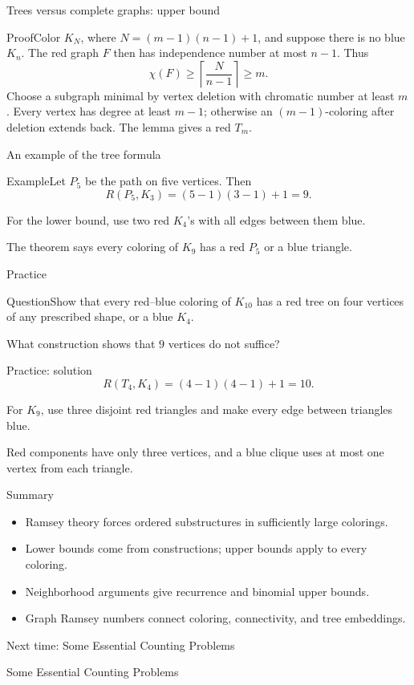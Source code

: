 \documentclass[aspectratio=169,11pt]{beamer}
\renewcommand{\Proof}[1]{\begin{block}{Proof}\normalsize #1\end{block}}
\newcommand{\Question}[1]{\begin{block}{Question}#1\end{block}}
\renewcommand{\Example}[1]{\begin{block}{Example}#1\end{block}}
\newcommand{\gap}{\par\medskip}
\begin{document}
\begin{frame}{Trees versus complete graphs: upper bound}
\large
\Proof{Color $K_N$, where $N=(m-1)(n-1)+1$, and suppose there is no blue $K_n$. The red graph $F$ then has independence number at most $n-1$. Thus
\[\chi(F)\geq\left\lceil\frac{N}{n-1}\right\rceil\geq m.\]
Choose a subgraph minimal by vertex deletion with chromatic number at least $m$. Every vertex has degree at least $m-1$; otherwise an $(m-1)$-coloring after deletion extends back. The lemma gives a red $T_m$.}
\end{frame}
\begin{frame}{An example of the tree formula}
\large
\Example{Let $P_5$ be the path on five vertices. Then
\[R(P_5,K_3)=(5-1)(3-1)+1=9.\]}
\gap For the lower bound, use two red $K_4$'s with all edges between them blue.
\gap The theorem says every coloring of $K_9$ has a red $P_5$ or a blue triangle.
\end{frame}
\begin{frame}{Practice}
\large
\Question{Show that every red--blue coloring of $K_{10}$ has a red tree on four vertices of any prescribed shape, or a blue $K_4$.}
\gap What construction shows that $9$ vertices do not suffice?
\end{frame}
\begin{frame}{Practice: solution}
\large
\[R(T_4,K_4)=(4-1)(4-1)+1=10.\]
\gap For $K_9$, use three disjoint red triangles and make every edge between triangles blue.
\gap Red components have only three vertices, and a blue clique uses at most one vertex from each triangle.
\end{frame}
\begin{frame}{Summary}
\large
\begin{itemize}
\item Ramsey theory forces ordered substructures in sufficiently large colorings.
\item Lower bounds come from constructions; upper bounds apply to every coloring.
\item Neighborhood arguments give recurrence and binomial upper bounds.
\item Graph Ramsey numbers connect coloring, connectivity, and tree embeddings.
\end{itemize}
\end{frame}
\begin{frame}{Next time: Some Essential Counting Problems}\begin{center}{\Huge Some Essential Counting Problems}\end{center}\end{frame}
\end{document}
